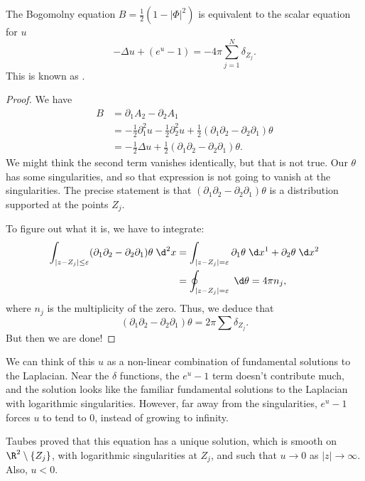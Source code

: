 \documentclass[a4paper]{article}
\begin{document}
\begin{thm}
  The Bogomolny equation $B = \frac{1}{2} (1 - |\Phi|^2)$ is equivalent to the scalar equation for $u$
  \[
    -\Delta u + (e^u - 1) = -4\pi \sum_{j = 1}^N \delta_{Z_j}.
  \]
  This is known as .
\end{thm}

\begin{proof}
  We have
  \begin{align*}
    B &= \partial_1 A_2 - \partial_2 A_1 \\
    &= -\frac{1}{2} \partial_1^2 u - \frac{1}{2} \partial_2^2 u + \frac{1}{2} (\partial_1 \partial_2 - \partial_2 \partial_1) \theta\\
    &= - \frac{1}{2} \Delta u + \frac{1}{2} (\partial_1 \partial_2 - \partial_2 \partial_1) \theta.
  \end{align*}
  We might think the second term vanishes identically, but that is not true. Our $\theta$ has some singularities, and so that expression is not going to vanish at the singularities. The precise statement is that $(\partial_1 \partial_2 - \partial_2 \partial_1) \theta$ is a distribution supported at the points $Z_j$.

  To figure out what it is, we have to integrate:
  \begin{align*}
    \int_{|z - Z_j| \leq \varepsilon} (\partial_1 \partial_2 - \partial_2 \partial_1) \theta \;\d^2 x &= \int_{|z - Z_j| = \varepsilon} \partial_1 \theta \;\d x^1 + \partial_2 \theta \;\d x^2 \\
    &= \oint_{|z - Z_j| = \varepsilon} \;\d \theta = 4\pi n_j,
  \end{align*}
  where $n_j$ is the multiplicity of the zero. Thus, we deduce that
  \[
    (\partial_1 \partial_2 - \partial_2 \partial_1) \theta = 2\pi \sum \delta_{Z_j}.
  \]
  But then we are done!
\end{proof}
We can think of this $u$ as a non-linear combination of fundamental solutions to the Laplacian. Near the $\delta$ functions, the $e^u - 1$ term doesn't contribute much, and the solution looks like the familiar fundamental solutions to the Laplacian with logarithmic singularities. However, far away from the singularities, $e^u - 1$ forces $u$ to tend to $0$, instead of growing to infinity.

Taubes proved that this equation has a unique solution, which is smooth on $\R^2 \setminus \{Z_j\}$, with logarithmic singularities at $Z_j$, and such that $u \to 0$ as $|z| \to \infty$. Also, $u < 0$.
\end{document}
